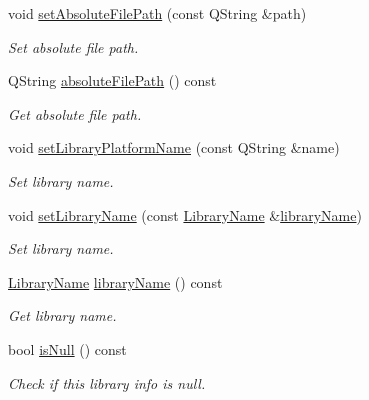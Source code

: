 \begin{DoxyCompactItemize}
\item 
void \hyperlink{class_mdt_1_1_deploy_utils_1_1_library_info_a0b7af709bcbd3c3b7f22e954d11ff812}{set\+Absolute\+File\+Path} (const Q\+String \&path)
\begin{DoxyCompactList}\small\item\em Set absolute file path. \end{DoxyCompactList}\item 
Q\+String \hyperlink{class_mdt_1_1_deploy_utils_1_1_library_info_a698bb904c4bbb50034b0a47f68c1c89a}{absolute\+File\+Path} () const 
\begin{DoxyCompactList}\small\item\em Get absolute file path. \end{DoxyCompactList}\item 
void \hyperlink{class_mdt_1_1_deploy_utils_1_1_library_info_aaa4bbfc9f8640f3d152e59c4e7763cf2}{set\+Library\+Platform\+Name} (const Q\+String \&name)
\begin{DoxyCompactList}\small\item\em Set library name. \end{DoxyCompactList}\item 
void \hyperlink{class_mdt_1_1_deploy_utils_1_1_library_info_acd5102f7ca77e51efde466342b27f0ce}{set\+Library\+Name} (const \hyperlink{class_mdt_1_1_deploy_utils_1_1_library_name}{Library\+Name} \&\hyperlink{class_mdt_1_1_deploy_utils_1_1_library_info_a6d3a8bd86079dfe21b3e1fcde3d6e068}{library\+Name})
\begin{DoxyCompactList}\small\item\em Set library name. \end{DoxyCompactList}\item 
\hyperlink{class_mdt_1_1_deploy_utils_1_1_library_name}{Library\+Name} \hyperlink{class_mdt_1_1_deploy_utils_1_1_library_info_a6d3a8bd86079dfe21b3e1fcde3d6e068}{library\+Name} () const 
\begin{DoxyCompactList}\small\item\em Get library name. \end{DoxyCompactList}\item 
bool \hyperlink{class_mdt_1_1_deploy_utils_1_1_library_info_a4a48fdaaeb10412441f4e1edddfd1026}{is\+Null} () const 
\begin{DoxyCompactList}\small\item\em Check if this library info is null. \end{DoxyCompactList}\end{DoxyCompactItemize}
